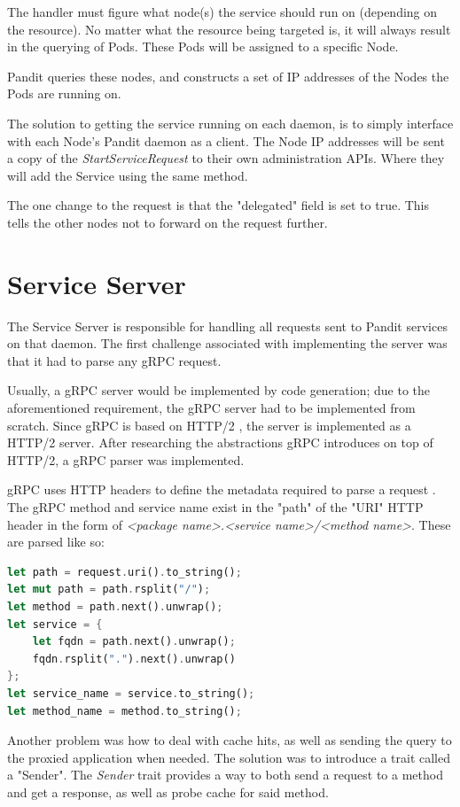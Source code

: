 \documentclass[a4paper,12pt]{report}
\begin{document}
The handler must figure what node(s) the service should run on (depending on the resource).
No matter what the resource being targeted is, it will always result in the querying of Pods.
These Pods will be assigned to a specific Node.

Pandit queries these nodes, and constructs a set of IP addresses of the Nodes the Pods are running on.

The solution to getting the service running on each daemon, is to simply interface with each Node's Pandit daemon as a client.
The Node IP addresses will be sent a copy of the \textit{StartServiceRequest} to their own administration APIs. Where they will add the Service using the same method.

The one change to the request is that the "delegated" field is set to true. This tells the other nodes not to forward on the request further.

\section{Service Server}

The Service Server is responsible for handling all requests sent to Pandit services on that daemon.
The first challenge associated with implementing the server was that it had to parse any gRPC request.

Usually, a gRPC server would be implemented by code generation; due to the aforementioned requirement, the gRPC server had to be implemented from scratch.
Since gRPC is based on HTTP/2 \cite{http2}, the server is implemented as a HTTP/2 server. After researching the abstractions gRPC introduces on top of HTTP/2,
a gRPC parser was implemented.

gRPC uses HTTP headers to define the metadata required to parse a request \cite{grpc_protocol}.
The gRPC method and service name exist in the "path" of the "URI" \cite{uris} HTTP header in the form of \textit{<package name>.<service name>/<method name>}.
These are parsed like so:

\begin{lstlisting}[language=Rust]
let path = request.uri().to_string();
let mut path = path.rsplit("/");
let method = path.next().unwrap();
let service = {
    let fqdn = path.next().unwrap();
    fqdn.rsplit(".").next().unwrap()
};
let service_name = service.to_string();
let method_name = method.to_string();
\end{lstlisting}

Another problem was how to deal with cache hits, as well as sending the query to the proxied application when needed.
The solution was to introduce a trait called a "Sender".
The \textit{Sender} trait provides a way to both send a request to a method and get a response, as well as probe cache for said method.
\end{document}
